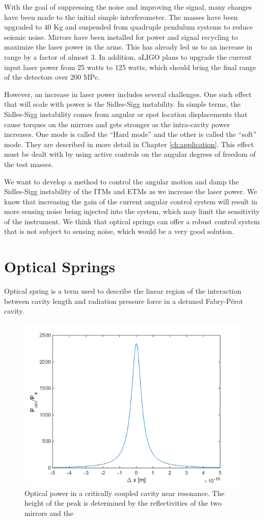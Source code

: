 With the goal of suppressing the noise and improving the signal, many changes have been made to the initial simple interferometer. The masses have been upgraded to 40 Kg and suspended from quadruple pendulum systems to reduce seismic noise. Mirrors have been installed for power and signal recycling to maximize the laser power in the arms. This has already led us to an increase in range by a factor of almost 3. In addition, aLIGO plans to upgrade the current input laser power from 25 watts to 125 watts, which should bring the final range of the detectors over 200 MPc. 

However, an increase in laser power includes several challenges. One such effect that will scale with power is the Sidles-Sigg instability. 
In simple terms, the Sidles-Sigg instability comes from angular or spot location displacements that cause torques on the mirrors and gets stronger as the intra-cavity power increases. 
One mode is called the ``Hard mode'' and the other is called the ``soft'' mode. They are described in more detail in Chapter \ref{ch:application}. 
This effect must be dealt with by using active controls on the angular degrees of freedom of the test masses.

We want to develop a method to control the angular motion and damp the Sidles-Sigg instability of the ITMs and ETMs as we increase the laser power.  We know that increasing the gain of the current angular control system will result in more sensing noise being injected into the system, which may limit the sensitivity of the instrument. We think that optical springs can offer a robust control system that is not subject to sensing noise, which would be a very good solution.

\section{Optical Springs}

Optical spring is a term used to describe the linear region of the interaction between cavity length and radiation pressure force in a detuned Fabry-P\'erot cavity.  



\begin{figure}[htbp]%
\center
\includegraphics[width=.5\textwidth]{figures/introduction/pcav}%
\caption[Cavity power near resonance]{Optical power in a critically coupled cavity near resonance. The height of the peak is determined by the reflectivities of the two mirrors and the }%
\label{fig:pcav}%
\end{figure}


